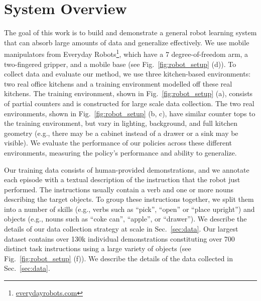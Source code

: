 \documentclass{article} %
\begin{document}
\section{System Overview}
\label{sec:system}
The goal of this work is to build and demonstrate a general robot learning system that can absorb large amounts of data and generalize effectively.
We use mobile manipulators from Everyday Robots\footnote{\url{everydayrobots.com}}, which have a 7 degree-of-freedom arm, a two-fingered gripper, and a mobile base (see Fig.~\ref{fig:robot_setup} (d)). To collect data and evaluate our method, we use three kitchen-based environments: two real office kitchens and a training environment modelled off these real kitchens. 
The training environment, shown in Fig.~\ref{fig:robot_setup} (a), consists of partial counters and is constructed for large scale data collection.
The two real environments, shown in Fig.~\ref{fig:robot_setup} (b, c), have similar counter tops to the training environment, but vary in lighting, background, and full kitchen geometry (e.g., there may be a cabinet instead of a drawer or a sink may be visible).
We evaluate the performance of our policies across these different environments, measuring the policy's performance and ability to generalize.


Our training data consists of human-provided demonstrations, and we annotate each episode with a textual description of the instruction that the robot just performed.  
The instructions usually contain a verb and one or more nouns describing the target objects. 
To group these instructions together, we split them into a number of skills (e.g., verbs such as ``pick'', ``open'' or ``place upright'') and objects (e.g., nouns such as ``coke can'', ``apple'', or ``drawer''). We describe the details of our data collection strategy at scale in Sec.~\ref{sec:data}.
Our largest dataset contains over 130k individual demonstrations constituting over 700 distinct task instructions using a large variety of objects (see Fig.~\ref{fig:robot_setup} (f)). We describe the details of the data collected in Sec.~\ref{sec:data}.
\end{document}
